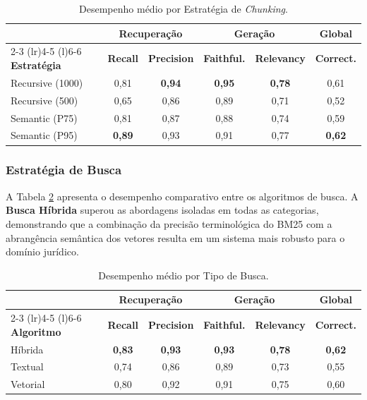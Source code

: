 \begin{table}[h]
  \centering
  \caption{Desempenho médio por Estratégia de \textit{Chunking}.}
  \label{tab:chunking_results}
  \small
  \begin{tabular}{lccccc}
    \toprule
    & \multicolumn{2}{c}{\textbf{Recuperação}} & \multicolumn{2}{c}{\textbf{Geração}} & \textbf{Global} \\ \cmidrule(lr){2-3} \cmidrule(lr){4-5} \cmidrule(l){6-6}
    \textbf{Estratégia} & \textbf{Recall} & \textbf{Precision} & \textbf{Faithful.} & \textbf{Relevancy} & \textbf{Correct.} \\ \midrule
    Recursive (1000) & 0,81 & \textbf{0,94} & \textbf{0,95} & \textbf{0,78} & 0,61 \\
    Recursive (500)  & 0,65 & 0,86 & 0,89 & 0,71 & 0,52 \\
    Semantic (P75)   & 0,81 & 0,87 & 0,88 & 0,74 & 0,59 \\
    Semantic (P95)   & \textbf{0,89} & 0,93 & 0,91 & 0,77 & \textbf{0,62} \\ \bottomrule
  \end{tabular}
\end{table}

\subsubsection{Estratégia de Busca}

A Tabela \ref{tab:search_results} apresenta o desempenho comparativo entre os algoritmos de busca. A \textbf{Busca Híbrida} superou as abordagens isoladas em todas as categorias, demonstrando que a combinação da precisão terminológica do BM25 com a abrangência semântica dos vetores resulta em um sistema mais robusto para o domínio jurídico.

\begin{table}[ht]
  \centering
  \caption{Desempenho médio por Tipo de Busca.}
  \label{tab:search_results}
  \small
  \begin{tabular}{lccccc}
    \toprule
    & \multicolumn{2}{c}{\textbf{Recuperação}} & \multicolumn{2}{c}{\textbf{Geração}} & \textbf{Global} \\ \cmidrule(lr){2-3} \cmidrule(lr){4-5} \cmidrule(l){6-6}
    \textbf{Algoritmo} & \textbf{Recall} & \textbf{Precision} & \textbf{Faithful.} & \textbf{Relevancy} & \textbf{Correct.} \\ \midrule
    Híbrida  & \textbf{0,83} & \textbf{0,93} & \textbf{0,93} & \textbf{0,78} & \textbf{0,62} \\
    Textual  & 0,74 & 0,86 & 0,89 & 0,73 & 0,55 \\
    Vetorial & 0,80 & 0,92 & 0,91 & 0,75 & 0,60 \\ \bottomrule
  \end{tabular}
\end{table}

